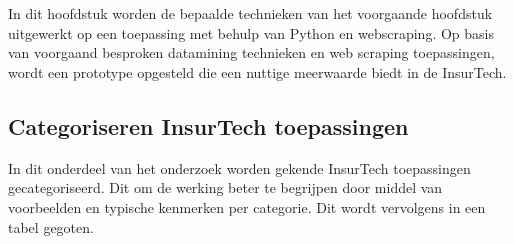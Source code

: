 \chapter{}
\label{ch:prototype}

\section{}
\label{sec:inleiding}

In dit hoofdstuk worden de bepaalde technieken van het voorgaande hoofdstuk uitgewerkt op een toepassing met behulp van Python en webscraping. Op basis van voorgaand besproken datamining technieken en web scraping toepassingen, wordt een prototype opgesteld die een nuttige meerwaarde biedt in de InsurTech.

\section{Categoriseren InsurTech toepassingen}
In dit onderdeel van het onderzoek worden gekende InsurTech toepassingen gecategoriseerd. Dit om de werking beter te begrijpen door middel van voorbeelden en typische kenmerken per categorie.
Dit wordt vervolgens in een tabel gegoten.


\begin{table}[htbp]
	\caption{Verschillende insurtech types}
\end{table}

